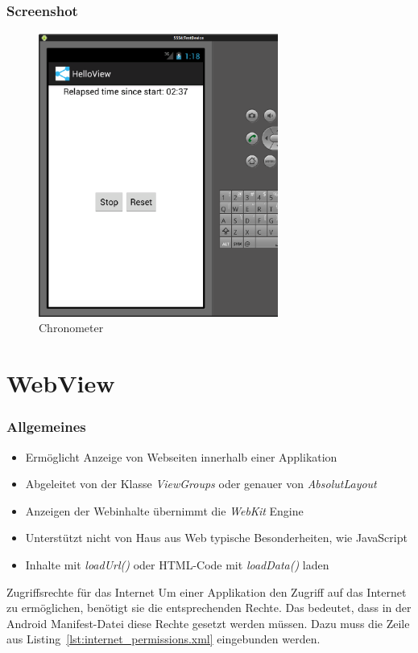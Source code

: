 \begin{frame}
   \frametitle{Screenshot}
   \begin{figure}[h!]
     \centering
     \includegraphics[width=0.7\textwidth]{pictures/chronometer.ps}
     \caption{
        Chronometer
     }
     \label{fig:chronometer}
   \end{figure}
\end{frame}

\section{WebView}
\begin{frame}[label=webview]
   \frametitle{Allgemeines}
   \begin{itemize}
      \item Ermöglicht Anzeige von Webseiten innerhalb einer Applikation
      \item Abgeleitet von der Klasse \emph{ViewGroups} oder genauer von \emph{AbsolutLayout}
      \item Anzeigen der Webinhalte übernimmt die \emph{WebKit} Engine
      \item Unterstützt nicht von Haus aus Web typische Besonderheiten, wie JavaScript
      \item Inhalte mit \emph{loadUrl()} oder HTML-Code mit \emph{loadData()} laden
   \end{itemize}

   \begin{alertblock}{Zugriffsrechte für das Internet}
      Um einer Applikation den Zugriff auf das Internet zu ermöglichen, benötigt sie 
      die entsprechenden Rechte. Das bedeutet, dass in der Android Manifest-Datei 
      diese Rechte gesetzt werden müssen. Dazu muss die Zeile aus 
      Listing~\ref{lst:internet_permissions.xml} eingebunden werden.

      \vspace{5mm}

       
   \end{alertblock}
\end{frame}

